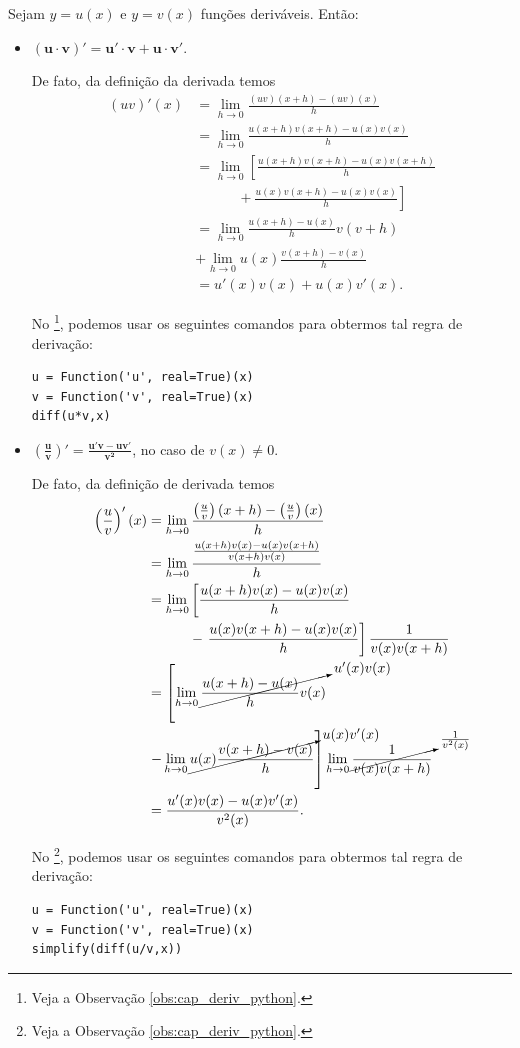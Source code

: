 Sejam $y = u(x)$ e $y = v(x)$ funções deriváveis. Então:
\begin{itemize}
\item $\pmb{(u\cdot v)' = u'\cdot v+u\cdot v'}$.

  De fato, da definição da derivada temos
  \begin{align}
    (uv)'(x) &= \lim_{h\to 0} \frac{(uv)(x+h)-(uv)(x)}{h}\\
             &= \lim_{h\to 0} \frac{u(x+h)v(x+h)-u(x)v(x)}{h}\\
             &= \lim_{h\to 0} \left[\frac{u(x+h)v(x+h)-u(x)v(x+h)}{h}\right.\\
             &\qquad\quad+ \left.\frac{u(x)v(x+h)-u(x)v(x)}{h}\right]\\
             &= \lim_{h\to 0} \frac{u(x+h)-u(x)}{h}v(v+h) \\
             &+ \lim_{h\to 0} u(x)\frac{v(x+h)-v(x)}{h}\\
             &= u'(x)v(x) + u(x)v'(x).
  \end{align}
  
  \ifispython
  No \sympy\footnote{Veja a Observação \ref{obs:cap_deriv_python}.}, podemos usar os seguintes comandos para obtermos tal regra de derivação:
\begin{verbatim}
u = Function('u', real=True)(x)
v = Function('v', real=True)(x)
diff(u*v,x)
\end{verbatim}
  \fi
  
\item $\displaystyle\pmb{\left(\frac{u}{v}\right)' = \frac{u'v-uv'}{v^2}}$, no caso de $v(x)\neq 0$.

  De fato, da definição de derivada temos
  \begin{align}
    \left(\frac{u}{v}\right)'(x) &= \lim_{h\to 0} \frac{\left(\frac{u}{v}\right)(x+h)-\left(\frac{u}{v}\right)(x)}{h} \\
                                 &= \lim_{h\to 0} \frac{\frac{u(x+h)v(x)-u(x)v(x+h)}{v(x+h)v(x)}}{h}\\
                                 &= \lim_{h\to 0} \left[\frac{u(x+h)v(x)-u(x)v(x)}{h}\right. \\
                                 &\qquad\quad - \left.\frac{u(x)v(x+h)-u(x)v(x)}{h}\right]\frac{1}{v(x)v(x+h)}\\
                                 &= \left[\lim_{h\to 0} \cancelto{u'(x)v(x)}{\frac{u(x+h)-u(x)}{h}v(x)}\right. \\
                                 &\left. - \lim_{h\to 0} \cancelto{u(x)v'(x)}{u(x)\frac{v(x+h)-v(x)}{h}}\right]\lim_{h\to 0} \cancelto{\frac{1}{v^2(x)}}{\frac{1}{v(x)v(x+h)}}\\
                                 &= \frac{u'(x)v(x)-u(x)v'(x)}{v^2(x)}.
  \end{align}
  
  \ifispython
  No \sympy\footnote{Veja a Observação \ref{obs:cap_deriv_python}.}, podemos usar os seguintes comandos para obtermos tal regra de derivação:
\begin{verbatim}
u = Function('u', real=True)(x)
v = Function('v', real=True)(x)
simplify(diff(u/v,x))
\end{verbatim}
  \fi
\end{itemize}

